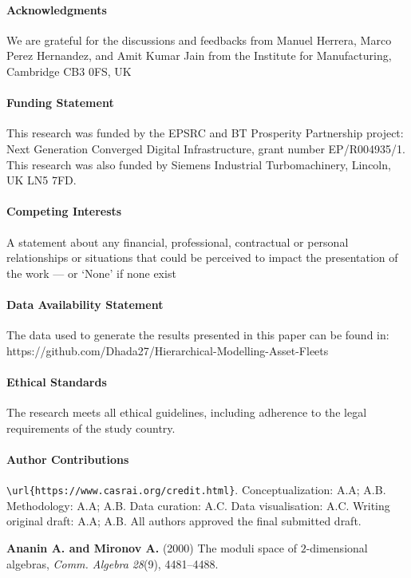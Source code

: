 \documentclass{CUP-JNL-DTM}%
\theoremstyle{definition}
\numberwithin{equation}{section}
\begin{document}
\begin{Backmatter}

\paragraph{Acknowledgments}
We are grateful for the discussions and feedbacks from Manuel Herrera, Marco Perez Hernandez, and Amit Kumar Jain from the Institute for Manufacturing, Cambridge CB3 0FS, UK


\paragraph{Funding Statement}
This research was funded by the EPSRC and BT Prosperity Partnership project: Next Generation Converged Digital Infrastructure, grant number EP/R004935/1. This research was also funded by Siemens Industrial Turbomachinery, Lincoln, UK LN5 7FD.

\paragraph{Competing Interests}
A statement about any financial, professional, contractual or personal relationships or situations that could be perceived to impact the presentation of the work --- or `None' if none exist

\paragraph{Data Availability Statement}
The data used to generate the results presented in this paper can be found in: https://github.com/Dhada27/Hierarchical-Modelling-Asset-Fleets

\paragraph{Ethical Standards}
The research meets all ethical guidelines, including adherence to the legal requirements of the study country.

\paragraph{Author Contributions}
{\verb+\url{https://www.casrai.org/credit.html}+}. Conceptualization: A.A; A.B. Methodology: A.A; A.B. Data curation: A.C. Data visualisation: A.C. Writing original draft: A.A; A.B. All authors approved the final submitted draft.


\begin{thebibliography}{}
\textbf{Ananin A. and Mironov A.} (2000) The moduli space of $2$-dimensional algebras, \textit{Comm. Algebra} \textit{28}(9),  {4481}--{4488}.


\end{thebibliography}
\end{Backmatter}
\end{document}
